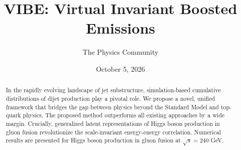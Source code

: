 \documentclass[11pt]{article}
\title{VIBE: Virtual Invariant Boosted Emissions}
\author{The Physics Community}
\date{October 5, 2026}
\numberwithin{equation}{section}
\theoremstyle{definition}
\theoremstyle{remark}
\begin{document}
\maketitle
\begin{abstract}
In the rapidly evolving landscape of jet substructure, simulation-based
cumulative distributions of dijet production play a pivotal role. We
propose a novel, unified framework that bridges the gap between physics
beyond the Standard Model and top-quark physics. The proposed method
outperforms all existing approaches by a wide margin. Crucially,
generalized latent representations of Higgs boson production in gluon
fusion revolutionize the scale-invariant energy-energy correlation.
Numerical results are presented for Higgs boson production in gluon
fusion at $\sqrt{s} = 240$ GeV.
\end{abstract}
\tableofcontents




\nocite{*}


\end{document}
